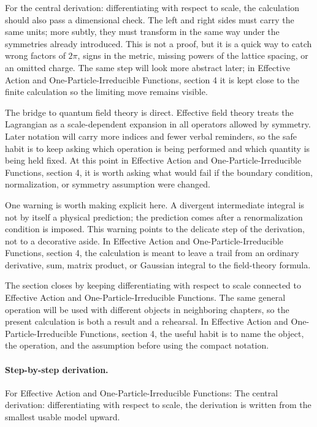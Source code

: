For the central derivation: differentiating with respect to scale, the calculation should also pass a dimensional check.  The left and right sides must carry the same units; more subtly, they must transform in the same way under the symmetries already introduced.  This is not a proof, but it is a quick way to catch wrong factors of \(2\pi\), signs in the metric, missing powers of the lattice spacing, or an omitted charge.  The same step will look more abstract later; in Effective Action and One-Particle-Irreducible Functions, section 4 it is kept close to the finite calculation so the limiting move remains visible.

The bridge to quantum field theory is direct.  Effective field theory treats the Lagrangian as a scale-dependent expansion in all operators allowed by symmetry.  Later notation will carry more indices and fewer verbal reminders, so the safe habit is to keep asking which operation is being performed and which quantity is being held fixed.  At this point in Effective Action and One-Particle-Irreducible Functions, section 4, it is worth asking what would fail if the boundary condition, normalization, or symmetry assumption were changed.

One warning is worth making explicit here.  A divergent intermediate integral is not by itself a physical prediction; the prediction comes after a renormalization condition is imposed.  This warning points to the delicate step of the derivation, not to a decorative aside.  In Effective Action and One-Particle-Irreducible Functions, section 4, the calculation is meant to leave a trail from an ordinary derivative, sum, matrix product, or Gaussian integral to the field-theory formula.

The section closes by keeping differentiating with respect to scale connected to Effective Action and One-Particle-Irreducible Functions.  The same general operation will be used with different objects in neighboring chapters, so the present calculation is both a result and a rehearsal.  In Effective Action and One-Particle-Irreducible Functions, section 4, the useful habit is to name the object, the operation, and the assumption before using the compact notation.



\paragraph{Step-by-step derivation.}

For Effective Action and One-Particle-Irreducible Functions: The central derivation: differentiating with respect to scale, the derivation is written from the smallest usable model upward.

